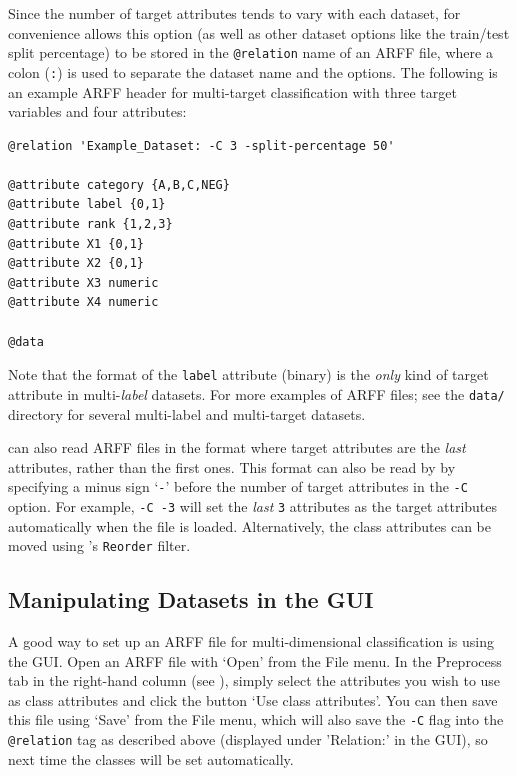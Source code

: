 \documentclass[11pt]{article}
\newcommand{\MEKA}{Meka}
\newcommand{\WEKA}{Weka}
\newcommand{\MULAN}{Mulan}
\begin{document}
Since the number of target attributes tends to vary with each dataset, for convenience \framework{\MEKA} allows this option (as well as other dataset options like the train/test split percentage) to be stored in the \texttt{@relation} name of an ARFF file, where a colon (\texttt{:}) is used to separate the dataset name and the options. The following is an example ARFF header for multi-target classification with three target variables and four attributes:

{\small
\begin{verbatim}
@relation 'Example_Dataset: -C 3 -split-percentage 50'

@attribute category {A,B,C,NEG}
@attribute label {0,1}
@attribute rank {1,2,3}
@attribute X1 {0,1}
@attribute X2 {0,1}
@attribute X3 numeric
@attribute X4 numeric

@data
\end{verbatim}
}

Note that the format of the \texttt{label} attribute (binary) is the \emph{only} kind of target attribute in multi-\emph{label} datasets. For more examples of \framework{\MEKA} ARFF files; see the \texttt{data/} directory for several multi-label and multi-target datasets.

\framework{\MEKA} can also read ARFF files in the \framework{\MULAN} format where target attributes are the \emph{last} attributes, rather than the first ones. This format can also be read by \framework{\MEKA} by specifying a minus sign `\texttt{-}' before the number of target attributes in the \texttt{-C} option. For example, \texttt{-C -3} will set the \emph{last} \texttt{3} attributes as the target attributes automatically when the file is loaded. Alternatively, the class attributes can be moved using \framework{\WEKA}'s \texttt{Reorder} filter. %


\subsection{Manipulating Datasets in the GUI}
\label{sec:data.gui}

A good way to set up an ARFF file for multi-dimensional classification is using the GUI. Open an ARFF file with `\textsf{Open}' from the \textsf{File} menu. In the \textsf{Preprocess} tab in the right-hand column (see ), simply select the attributes you wish to use as class attributes and click the button `\textsf{Use class attributes}'. You can then save this file using `\textsf{Save}' from the \textsf{File} menu, which will also save the \texttt{-C} flag into the \texttt{@relation} tag as described above (displayed under '\textsf{Relation:}' in the GUI), so next time the classes will be set automatically.
\end{document}
